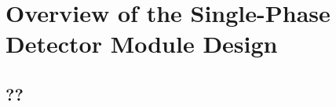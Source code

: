 \chapter{Overview of the Single-Phase Detector Module Design}
\label{ch:fdsp-ov}


\section{??}
\label{sec:fdsp-ov-??}


